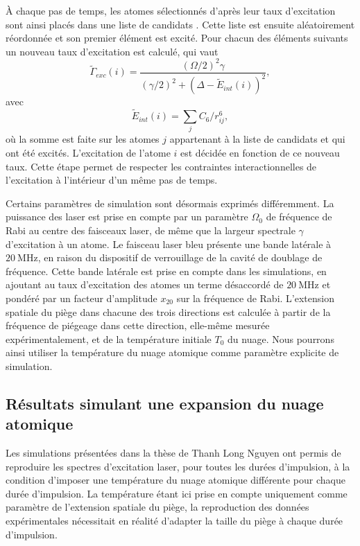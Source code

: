 \`A chaque pas de temps, les atomes sélectionnés d'après leur taux d'excitation sont ainsi placés dans une liste  de \og candidats \fg{}.
Cette liste est ensuite aléatoirement réordonnée et son premier élément est excité.
Pour chacun des éléments suivants un nouveau taux d'excitation est calculé, qui vaut
\begin{equation}
\tilde{\Gamma}_{exc}(i) = \frac{(\Omega/2)^2 \gamma}{(\gamma/2)^2 + (\Delta - \tilde{E}_{int}(i))^2},
\end{equation}
avec
\begin{equation}
\tilde{E}_{int}(i) = \sum_{j} C_6/r_{ij}^6,
\end{equation}
où la somme est faite sur les atomes $j$ appartenant à la liste de candidats  et qui ont été excités.
L'excitation de l'atome $i$ est décidée en fonction de ce nouveau taux.
Cette étape permet de respecter les contraintes interactionnelles de l'excitation à l'intérieur d'un même pas de temps.

Certains paramètres de simulation sont désormais exprimés différemment.
La puissance des laser est prise en compte par un paramètre $\Omega_0$ de fréquence de Rabi au centre des faisceaux laser, de même que la largeur spectrale $\gamma$ d'excitation à un atome.
Le faisceau laser bleu présente une bande latérale à $\SI{20}{\MHz}$, en raison du dispositif de verrouillage de la cavité de doublage de fréquence.
Cette bande latérale est prise en compte dans les simulations, en ajoutant au taux d'excitation des atomes un terme désaccordé de $\SI{20}{\MHz}$ et pondéré par un facteur d'amplitude $x_{20}$ sur la fréquence de Rabi.
L'extension spatiale du piège dans chacune des trois directions est calculée à partir de la fréquence de piégeage dans cette direction, elle-même mesurée expérimentalement, et de la température initiale $T_0$ du nuage.
Nous pourrons ainsi utiliser la température du nuage atomique comme paramètre explicite de simulation.

\newpage
\subsection{Résultats simulant une expansion du nuage atomique}\label{subsec:bigsigma}
\noindent Les simulations présentées dans la thèse de Thanh Long Nguyen \cite{PHD_NGUYEN} ont permis de reproduire les spectres d'excitation laser, pour toutes les durées d'impulsion, à la condition d'imposer une température du nuage atomique différente pour chaque durée d'impulsion.
La température étant ici prise en compte uniquement comme paramètre de l'extension spatiale du piège, la reproduction des données expérimentales nécessitait en réalité d'adapter la taille du piège à chaque durée d'impulsion.

